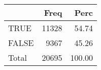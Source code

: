 
\begin{tabular}[t]{lrr}
\toprule
  & Freq & Perc\\
\midrule
TRUE & 11328 & 54.74\\
FALSE & 9367 & 45.26\\
Total & 20695 & 100.00\\
\bottomrule
\end{tabular}